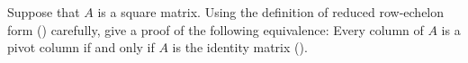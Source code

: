 Suppose that $A$ is a square matrix.  Using the definition of reduced row-echelon form () carefully, give a proof of the following equivalence:  Every column of $A$ is a pivot column if and only if $A$ is the identity matrix ().